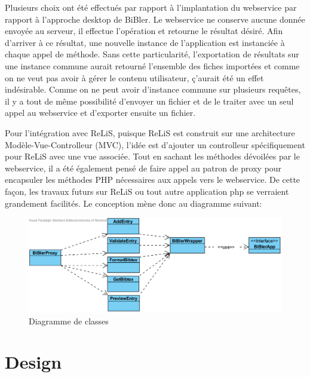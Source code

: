 \documentclass[12pt,titlepage]{article}
\let\oldsection\section
\renewcommand\section{\clearpage\oldsection}
\begin{document}
Plusieurs choix ont été effectués par rapport à l'implantation du webservice par rapport à l'approche desktop de BiBler. Le webservice ne conserve aucune donnée envoyée au serveur, il effectue l'opération et retourne le résultat désiré. Afin d'arriver à ce résultat, une nouvelle instance de l'application est instanciée à chaque appel de méthode. Sans cette particularité, l'exportation de résultats sur une instance commune aurait retourné l'ensemble des fiches importées et comme on ne veut pas avoir à gérer le contenu utilisateur, ç'aurait été un effet indésirable. Comme on ne peut avoir d'instance commune sur plusieurs requêtes, il y a tout de même possibilité d'envoyer un fichier et de le traiter avec un seul appel au webservice et d'exporter ensuite un fichier.\newline

Pour l'intégration avec ReLiS, puisque ReLiS est construit sur une architecture Modèle-Vue-Controlleur (MVC), l'idée est d'ajouter un controlleur spécifiquement pour ReLiS avec une vue associée. Tout en sachant les méthodes dévoilées par le webservice, il a été également pensé de faire appel au patron de proxy pour encapsuler les méthodes PHP nécessaires aux appels vers le webservice. De cette façon, les travaux futurs sur ReLiS ou tout autre application php se verraient grandement facilités. Le conception mène donc au diagramme suivant: 

\begin{figure}[h!]
\caption{Diagramme de classes}
\includegraphics{DomainClassDiagram.png}
\end{figure}

\section{Design}
\end{document}
